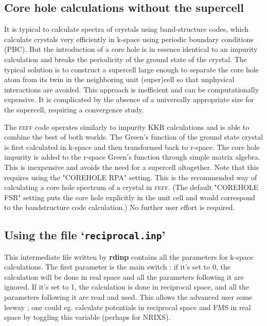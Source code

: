 \documentclass[11pt,oneside]{report} %
\newcommand{\program}[1]{\textsc{#1}}
\newcommand{\feff}{\program{feff}}
\newcommand{\file}[1]{`\texttt{#1}'}
\newcommand{\module}[1]{\textrm{\bf{#1}}}
\begin{document}
\subsection{Core hole calculations without the supercell}
It is typical to calculate spectra of crystals using band-structure codes, which calculate crystals very efficiently in k-space using periodic boundary conditions (PBC).  But the introduction of a core hole is in essence identical to an impurity calculation and breaks the periodicity of the ground state of the crystal.  The typical solution is to construct a supercell large enough to separate the core hole atom from its twin in the neighboring unit (super)cell so that unphysical interactions are avoided.  This approach is inefficient and can be computationally expensive.  It is complicated by the absence of a universally appropriate size for the supercell, requiring a convergence study.

The {\feff} code operates similarly to impurity KKR calculations and is able to combine the best of both worlds.  The Green's function of the ground state crystal is first calculated in k-space and then transformed back to r-space.  The core hole impurity is added to the r-space Green's function through simple matrix algebra.  This is inexpensive and avoids the need for a supercell altogether.  Note that this requires using the "COREHOLE RPA" setting.  This is the recommended way of calculating a core hole spectrum of a crystal in {\feff}.  (The default "COREHOLE FSR" setting puts the core hole explicitly in the unit cell and would correspond to the bandstructure code calculation.)  No further user effort is required.



\subsection{Using the file \file{reciprocal.inp}}
This intermediate file written by \module{rdinp} contains all the parameters for k-space calculations.  The first parameter is the main switch : if it's set to 0, the calculation will be done in real space and all the parameters following it are ignored.  If it's set to 1, the calculation is done in reciprocal space, and all the parameters following it are read and used.  This allows the advanced user some leeway ; one could eg. calculate potentials in reciprocal space and FMS in real space by toggling this variable (perhaps for NRIXS).
\end{document}
